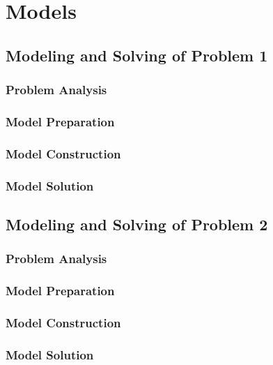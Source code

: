 \newpage
\section{Models}
\subsection{Modeling and Solving of Problem 1}
\subsubsection{Problem Analysis}





\subsubsection{Model Preparation}





\subsubsection{Model Construction}






\subsubsection{Model Solution}








\subsection{Modeling and Solving of Problem 2}
\subsubsection{Problem Analysis}





\subsubsection{Model Preparation}





\subsubsection{Model Construction}






\subsubsection{Model Solution}
